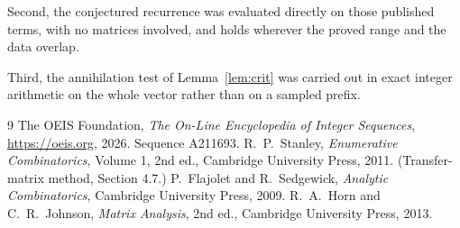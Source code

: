 \documentclass[11pt,a4paper]{article}
\theoremstyle{plain}
\theoremstyle{definition}
\begin{document}
Second, the conjectured recurrence was evaluated directly on those published terms, with no
matrices involved, and holds wherever the proved range and the data overlap.

Third, the annihilation test of Lemma~\ref{lem:crit} was carried out in exact integer
arithmetic on the whole vector rather than on a sampled prefix.

\begin{thebibliography}{9}
 The OEIS Foundation, \emph{The On-Line Encyclopedia of Integer
Sequences}, \url{https://oeis.org}, 2026. Sequence A211693.
 R.~P.~Stanley, \emph{Enumerative Combinatorics}, Volume 1, 2nd ed.,
Cambridge University Press, 2011. (Transfer-matrix method, Section 4.7.)
 P.~Flajolet and R.~Sedgewick, \emph{Analytic Combinatorics}, Cambridge
University Press, 2009.
 R.~A.~Horn and C.~R.~Johnson, \emph{Matrix Analysis}, 2nd ed., Cambridge
University Press, 2013.
\end{thebibliography}
\end{document}
